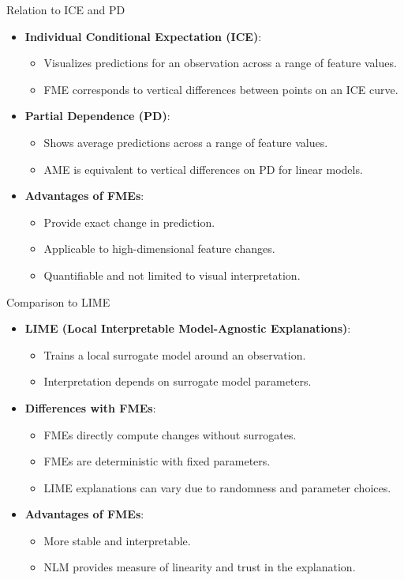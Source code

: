 \documentclass[10pt,compress,t,notes=noshow, xcolor=table]{beamer}
\begin{document}
\begin{frame}{Relation to ICE and PD}
\begin{itemize}
\item \textbf{Individual Conditional Expectation (ICE)}:
\begin{itemize}
\item Visualizes predictions for an observation across a range of feature values.
\item FME corresponds to vertical differences between points on an ICE curve.
\end{itemize}
\item \textbf{Partial Dependence (PD)}:
\begin{itemize}
\item Shows average predictions across a range of feature values.
\item AME is equivalent to vertical differences on PD for linear models.
\end{itemize}
\item \textbf{Advantages of FMEs}:
\begin{itemize}
\item Provide exact change in prediction.
\item Applicable to high-dimensional feature changes.
\item Quantifiable and not limited to visual interpretation.
\end{itemize}
\end{itemize}
\end{frame}

\begin{frame}{Comparison to LIME}
\begin{itemize}
\item \textbf{LIME (Local Interpretable Model-Agnostic Explanations)}:
\begin{itemize}
\item Trains a local surrogate model around an observation.
\item Interpretation depends on surrogate model parameters.
\end{itemize}
\item \textbf{Differences with FMEs}:
\begin{itemize}
\item FMEs directly compute changes without surrogates.
\item FMEs are deterministic with fixed parameters.
\item LIME explanations can vary due to randomness and parameter choices.
\end{itemize}
\item \textbf{Advantages of FMEs}:
\begin{itemize}
\item More stable and interpretable.
\item NLM provides measure of linearity and trust in the explanation.
\end{itemize}
\end{itemize}
\end{frame}
\end{document}
